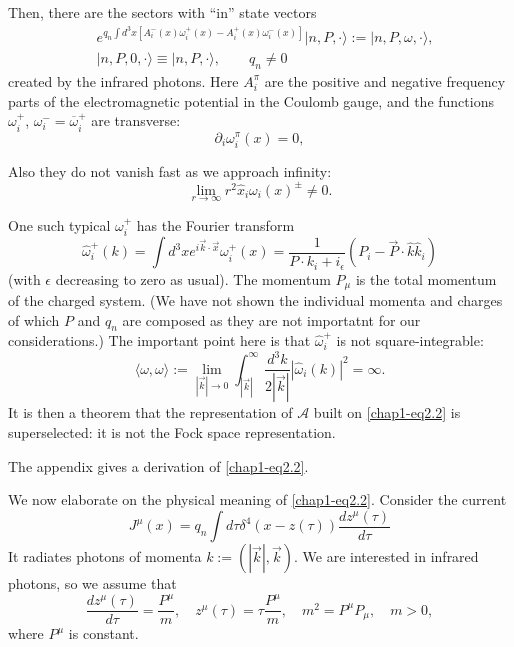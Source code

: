 Then, there are the sectors with ``in'' state vectors \cite{key4}
\begin{align}
& e^{q_{n}\int d^{3}x[A^{-}_{i}(x)\omega^{+}_{i}(x)-A^{+}_{i}(x)\omega^{-}_{i}(x)]}|n,P,\cdot\rangle := |n,P,\omega,\cdot\rangle,\label{chap1-eq2.2}\\
& |n,P,0,\cdot\rangle \equiv |n,P,\cdot\rangle,\qquad q_{n}\neq 0\label{chap1-eq2.3}
\end{align}
created by the infrared photons. Here $A^{\pi}_{i}$ are the positive and negative frequency parts of the electromagnetic potential in the Coulomb gauge, and the functions $\omega^{+}_{i}$, $\omega^{-}_{i}=\overline{\omega}^{+}_{i}$ are transverse:
\begin{equation}
\partial_{i}\omega^{\pi}_{i}(x)=0,\label{chap1-eq2.4}
\end{equation}

Also they do not vanish fast as we approach infinity:
\begin{equation}
\lim\limits_{r\to\infty}r^{2}\hat{x}_{i}\omega_{i}(x)^{\pm}\neq 0.\label{chap1-eq2.5}
\end{equation}

One such typical $\omega^{+}_{i}$ has the Fourier transform
\begin{equation}
\hat{\omega}_{i}^{+}(k)=\int d^{3}xe^{i\overrightarrow{k}\cdot \overrightarrow{x}}\omega^{+}_{i}(x)=\frac{1}{P\cdot k_{i}+i_{\epsilon}}(P_{i}-\overrightarrow{P}\cdot \widehat{k}\widehat{k}_{i})\label{chap1-eq2.6}
\end{equation}
(with $\epsilon$ decreasing to zero as usual). The momentum $P_{\mu}$ is the total momentum of the charged system. (We have not shown the individual momenta and charges of which $P$ and $q_{n}$ are composed as they are not importatnt for our considerations.) The important point here is that $\widehat{\omega}^{+}_{i}$ is not square-integrable:
\begin{equation}
\langle \omega,\omega\rangle := \lim\limits_{|\overrightarrow{k}|\to 0}\int^{\infty}_{|\overrightarrow{k}|}\frac{d^{3}k}{2|\overrightarrow{k}|}|\widehat{\omega}_{i}(k)|^{2}=\infty.\label{chap1-eq2.7}
\end{equation}
It is then a theorem \cite{key6} that the representation of $\mathcal{A}$ built on \eqref{chap1-eq2.2} is superselected: it is not the Fock space representation.

The appendix gives a derivation of \eqref{chap1-eq2.2}.

We now elaborate on the physical meaning of \eqref{chap1-eq2.2}. Consider the current
\begin{equation}
J^{\mu}(x)=q_{n}\int d\tau \delta^{4}(x-z(\tau))\frac{dz^{\mu}(\tau)}{d\tau}\label{chap1-eq2.8}
\end{equation}
It radiates photons of momenta $k := (| \overrightarrow{k}|, \overrightarrow{k})$. We are interested in infrared photons, so we assume that
\begin{equation}
\frac{dz^{\mu}(\tau)}{d\tau}=\dfrac{P^{\mu}}{m},\quad z^{\mu}(\tau)=\tau\frac{P^{\mu}}{m},\quad m^{2}=P^{\mu}P_{\mu},\quad m>0,\label{chap1-eq2.9}
\end{equation}
where $P^{\mu}$ is constant.

